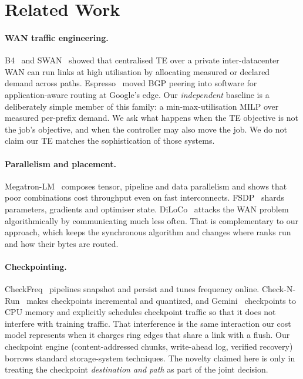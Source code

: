 \section{Related Work}
\label{sec:related}

\paragraph{WAN traffic engineering.}
B4~\citep{b4} and SWAN~\citep{swan} showed that centralised TE over a private inter-datacenter WAN can run
links at high utilisation by allocating measured or declared demand across paths. Espresso~\citep{espresso}
moved BGP peering into software for application-aware routing at Google's edge. Our \emph{independent}
baseline is a deliberately simple member of this family: a min-max-utilisation MILP over measured
per-prefix demand. We ask what happens when the TE objective is not the job's objective, and when the
controller may also move the job. We do not claim our TE matches the sophistication of those systems.

\paragraph{Parallelism and placement.}
Megatron-LM~\citep{megatron} composes tensor, pipeline and data parallelism and shows that poor
combinations cost throughput even on fast interconnects. FSDP~\citep{fsdp} shards parameters, gradients
and optimiser state. DiLoCo~\citep{diloco} attacks the WAN problem algorithmically by communicating much less
often. That is complementary to our approach, which keeps the synchronous algorithm and changes where
ranks run and how their bytes are routed.

\paragraph{Checkpointing.}
CheckFreq~\citep{checkfreq} pipelines snapshot and persist and tunes frequency online. Check-N-Run~\citep{checknrun}
makes checkpoints incremental and quantized, and Gemini~\citep{gemini} checkpoints to CPU memory and
explicitly schedules checkpoint traffic so that it does not interfere with training traffic. That
interference is the same interaction our cost model represents when it charges ring edges that share a
link with a flush. Our checkpoint engine (content-addressed chunks, write-ahead log, verified recovery)
borrows standard storage-system techniques. The novelty claimed here is only in treating the checkpoint
\emph{destination and path} as part of the joint decision.

